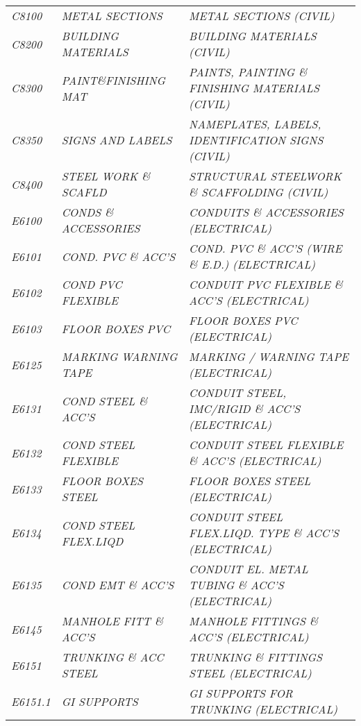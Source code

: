 \begin{landscape}
\begin{longtable}[l]{l%
                  l|%
                  l|}
\itshape C8100       &\itshape METAL SECTIONS   &\itshape METAL SECTIONS (CIVIL)   \\
\itshape C8200       &\itshape BUILDING MATERIALS   &\itshape BUILDING MATERIALS (CIVIL)   \\
\itshape C8300       &\itshape PAINT\&FINISHING MAT   &\itshape PAINTS, PAINTING \& FINISHING MATERIALS (CIVIL)   \\
\itshape C8350       &\itshape SIGNS AND LABELS   &\itshape NAMEPLATES, LABELS, IDENTIFICATION SIGNS (CIVIL)   \\
\itshape C8400       &\itshape STEEL WORK \& SCAFLD   &\itshape STRUCTURAL STEELWORK \& SCAFFOLDING (CIVIL)   \\
\itshape E6100       &\itshape CONDS \& ACCESSORIES   &\itshape CONDUITS \& ACCESSORIES (ELECTRICAL)   \\
\itshape E6101       &\itshape COND. PVC \& ACC'S   &\itshape COND. PVC \& ACC'S (WIRE \& E.D.) (ELECTRICAL)   \\
\itshape E6102       &\itshape COND PVC FLEXIBLE   &\itshape CONDUIT PVC FLEXIBLE \& ACC'S (ELECTRICAL)   \\
\itshape E6103       &\itshape FLOOR BOXES PVC   &\itshape FLOOR BOXES PVC (ELECTRICAL)   \\
\itshape E6125       &\itshape MARKING WARNING TAPE   &\itshape MARKING / WARNING TAPE (ELECTRICAL)   \\
\itshape E6131       &\itshape COND STEEL \& ACC'S   &\itshape CONDUIT STEEL, IMC/RIGID \& ACC'S (ELECTRICAL)   \\
\itshape E6132       &\itshape COND STEEL FLEXIBLE   &\itshape CONDUIT STEEL FLEXIBLE \& ACC'S (ELECTRICAL)   \\
\itshape E6133       &\itshape FLOOR BOXES STEEL   &\itshape FLOOR BOXES STEEL (ELECTRICAL)   \\
\itshape E6134       &\itshape COND STEEL FLEX.LIQD   &\itshape CONDUIT STEEL FLEX.LIQD. TYPE \& ACC'S (ELECTRICAL)   \\
\itshape E6135       &\itshape COND EMT \& ACC'S   &\itshape CONDUIT EL. METAL TUBING \& ACC'S (ELECTRICAL)   \\
\itshape E6145       &\itshape MANHOLE FITT \& ACC'S   &\itshape MANHOLE FITTINGS \& ACC'S (ELECTRICAL)   \\
\itshape E6151       &\itshape TRUNKING \& ACC STEEL   &\itshape TRUNKING \& FITTINGS STEEL (ELECTRICAL)   \\
\itshape E6151.1     &\itshape GI SUPPORTS   &\itshape GI SUPPORTS FOR TRUNKING (ELECTRICAL)   \\

\end{longtable}
\end{landscape}

